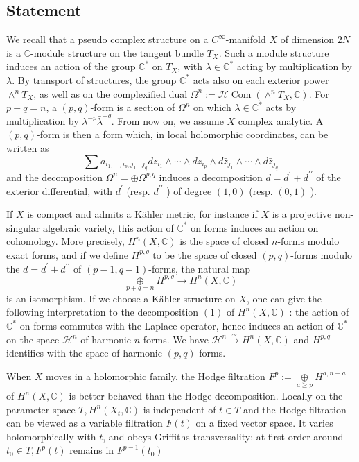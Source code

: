 \documentclass[12pt,twoside]{book}
\theoremstyle{plain}
\theoremstyle{definition}
\theoremstyle{remark}
\numberwithin{equation}{section}
\begin{document}
\subsection{Statement}
We recall that a pseudo complex structure on a $C^{\infty}$-manifold $X$ of dimension $2 N$ is a $\mathbb{C}$-module structure on the tangent bundle $T_X$. Such a module structure induces an action of the group $\mathbb{C}^*$ on $T_X$, with $\lambda \in \mathbb{C}^*$ acting by multiplication by $\lambda$. By transport of structures, the group $\mathbb{C}^*$ acts also on each exterior power $\wedge^n T_X$, as well as on the complexified dual $\Omega^n:=\mathcal{H} \operatorname{Com}\left(\wedge^n T_X, \mathbb{C}\right)$. For $p+q=n$, a $(p, q)$-form is a section of $\Omega^n$ on which $\lambda \in \mathbb{C}^*$ acts by multiplication by $\lambda^{-p} \bar{\lambda}^{-q}$.
From now on, we assume $X$ complex analytic. A $(p, q)$-form is then a form which, in local holomorphic coordinates, can be written as
$$
\sum a_{i_1, \ldots, i_p, j_1 \ldots j_q} d z_{i_1} \wedge \cdots \wedge d z_{i_p} \wedge d \bar{z}_{j_1} \wedge \cdots \wedge d \bar{z}_{j_q}
$$
and the decomposition $\Omega^n=\oplus \Omega^{p, q}$ induces a decomposition $d=d^{\prime}+d^{\prime \prime}$ of the exterior differential, with $d^{\prime}$ (resp. $d^{\prime \prime}$ ) of degree $(1,0)$ (resp. $(0,1)$ ).

If $X$ is compact and admits a Kähler metric, for instance if $X$ is a projective non-singular algebraic variety, this action of $\mathbb{C}^*$ on forms induces an action on cohomology. More precisely, $H^n(X, \mathbb{C})$ is the space of closed $n$-forms modulo exact forms, and if we define $H^{p, q}$ to be the space of closed $(p, q)$-forms modulo the $d=d^{\prime} +d^{\prime \prime}$ of $(p-1, q-1)$-forms, the natural map
$$
\underset{p+q=n}{\oplus} H^{p, q} \rightarrow H^n(X, \mathbb{C})
$$
is an isomorphism. If we choose a Kähler structure on $X$, one can give the following interpretation to the decomposition $(1)$ of $H^n(X, \mathbb{C})$ : the action of $\mathbb{C}^*$ on forms commutes with the Laplace operator, hence induces an action of $\mathbb{C}^*$ on the space $\mathcal{H}^n$ of harmonic $n$-forms. We have $\mathcal{H}^n \stackrel{\sim}{\longrightarrow} H^n(X, \mathbb{C})$ and $H^{p, q}$ identifies with the space of harmonic $(p, q)$-forms.

When $X$ moves in a holomorphic family, the Hodge filtration $F^p:=\underset{a \geq p}{\oplus} H^{a, n-a}$ of $H^n(X, \mathbb{C})$ is better behaved than the Hodge decomposition. Locally on the parameter space $T, H^n\left(X_t, \mathbb{C}\right)$ is independent of $t \in T$ and the Hodge filtration can be viewed as a variable filtration $F(t)$ on a fixed vector space. It varies holomorphically with $t$, and obeys Griffiths transversality: at first order around $t_0 \in T, F^p(t)$ remains in $F^{p-1}\left(t_0\right)$
\end{document}
